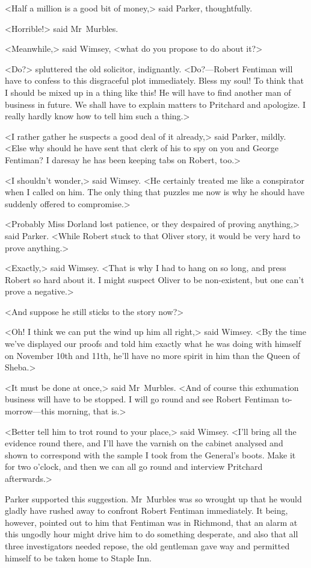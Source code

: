 <Half a million is a good bit of money,> said Parker, thoughtfully.

<Horrible!> said Mr~Murbles.

<Meanwhile,> said Wimsey, <what do you propose to do about it?>

<Do?> spluttered the old solicitor, indignantly. <Do?—Robert Fentiman will have to confess to this disgraceful plot immediately. Bless my soul! To think that I should be mixed up in a thing like this! He will have to find another man of business in future. We shall have to explain matters to Pritchard and apologize. I really hardly know how to tell him such a thing.>

<I rather gather he suspects a good deal of it already,> said Parker, mildly. <Else why should he have sent that clerk of his to spy on you and George Fentiman? I daresay he has been keeping tabs on Robert, too.>

<I shouldn't wonder,> said Wimsey. <He certainly treated me like a conspirator when I called on him. The only thing that puzzles me now is why he should have suddenly offered to compromise.>

<Probably Miss Dorland lost patience, or they despaired of proving anything,> said Parker. <While Robert stuck to that Oliver story, it would be very hard to prove anything.>

<Exactly,> said Wimsey. <That is why I had to hang on so long, and press Robert so hard about it. I might suspect Oliver to be non-existent, but one can't prove a negative.>

<And suppose he still sticks to the story now?>

<Oh! I think we can put the wind up him all right,> said Wimsey. <By the time we've displayed our proofs and told him exactly what he was doing with himself on November 10th and 11th, he'll have no more spirit in him than the Queen of Sheba.>

<It must be done at once,> said Mr~Murbles. <And of course this exhumation business will have to be stopped. I will go round and see Robert Fentiman to-morrow—this morning, that is.>

<Better tell him to trot round to your place,> said Wimsey. <I'll bring all the evidence round there, and I'll have the varnish on the cabinet analysed and shown to correspond with the sample I took from the General's boots. Make it for two o'clock, and then we can all go round and interview Pritchard afterwards.>

Parker supported this suggestion. Mr~Murbles was so wrought up that he would gladly have rushed away to confront Robert Fentiman immediately. It being, however, pointed out to him that Fentiman was in Richmond, that an alarm at this ungodly hour might drive him to do something desperate, and also that all three investigators needed repose, the old gentleman gave way and permitted himself to be taken home to Staple Inn.

